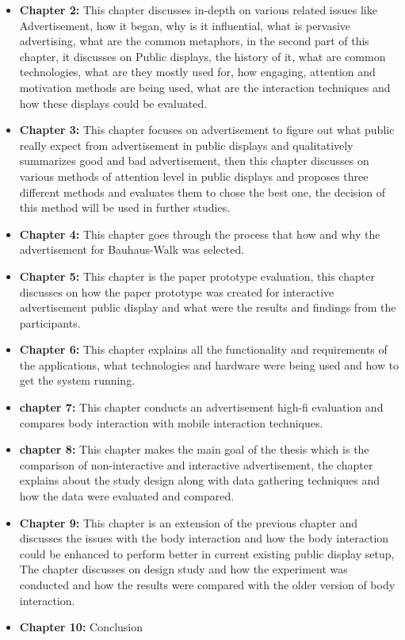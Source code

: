 \begin{itemize}

\item \textbf{Chapter 2:}
 This chapter discusses in-depth on various related issues like Advertisement, how it began, why is it influential, what is pervasive advertising, what are the common metaphors, in the second part of this chapter, it discusses on Public displays, the history of it, what are common technologies, what are they mostly used for, how engaging, attention and motivation methods are being used, what are the interaction techniques and how these displays could be evaluated.


\item \textbf{Chapter 3:}
This chapter focuses on advertisement to figure out what public really expect from advertisement in public displays and qualitatively summarizes good and bad advertisement, then this chapter discusses on various methods of attention level in public displays and proposes three different methods and evaluates them to chose the best one, the decision of this method will be used in further studies.


\item \textbf{Chapter 4:}
This chapter goes through the process that how and why the advertisement for Bauhaus-Walk was selected.


\item \textbf{Chapter 5:}
This chapter is the paper prototype evaluation, this chapter discusses on how the paper prototype was created for interactive advertisement public display and what were the results and findings from the participants. 


\item \textbf{Chapter 6:}
This chapter explains all the functionality and requirements of the applications, what technologies and hardware were being used and how to get the system running.


\item \textbf{chapter 7:}
This chapter conducts an advertisement high-fi evaluation and compares body interaction with mobile interaction techniques.


\item \textbf{chapter 8:}
This chapter makes the main goal of the thesis which is the comparison of non-interactive and interactive advertisement, the chapter explains about the study design along with data gathering techniques and how the data were evaluated and compared.


\item \textbf{Chapter 9:}
This chapter is an extension of the previous chapter and discusses the issues with the body interaction and how the body interaction could be enhanced to perform better in current existing public display setup, The chapter discusses on design study and how the experiment was conducted and how the results were compared with the older version of body interaction. 


\item \textbf{Chapter 10:}
Conclusion

\end{itemize}

